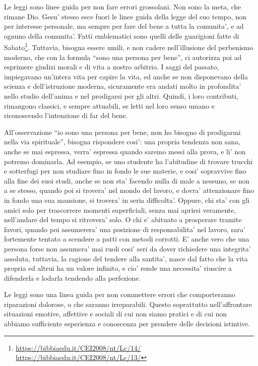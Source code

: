 Le leggi sono linee guida per non fare errori grossolani. Non sono la meta, che rimane Dio. Gesu' stesso esce fuori le linee guida della legge del suo tempo, non per interesse personale, ma sempre per fare del bene a tutta la comunita', e ad ognuno della comunita'. Fatti emblematici sono quelli delle guarigioni fatte di Sabato\footnote{\url{https://bibbiaedu.it/CEI2008/nt/Lc/14/} \url{https://bibbiaedu.it/CEI2008/nt/Lc/13/}}. Tuttavia, bisogna essere umili, e non cadere nell'illusione del perbenismo moderno, che con la formula ``sono una persona per bene'', ci autorizza poi ad esprimere giudizi morali e di vita a nostro arbitrio. I saggi del passato, impiegavano un'intera vita per capire la vita, ed anche se non disponevano della scienza e dell'istruzione moderna, sicuramente era andati molto in profondita' nello studio dell'anima e nel prodigarsi per gli altri. Quindi, i loro contributi, rimangono classici, e sempre attuabili, se letti nel loro senso umano e riconoscendo l'intenzione di far del bene.

All'osservazione ``io sono una persona per bene, non ho bisogno di prodigarmi nella via spirituale'', bisogna rispondere cosi': una propria tendenza non sana, anche se mai espressa, verra' espressa quando saremo messi alla prova, e li' non potremo dominarla. Ad esempio, se uno studente ha l'abitudine di trovare trucchi e sotterfugi per non studiare fino in fondo le sue materie, e cosi' sopravvive fino alla fine dei suoi studi, anche se non sta' facendo nulla di male a nessuno, se non a se stesso, quando poi si trovera' nel mondo del lavoro, e dovra' attenzionare fino in fondo una sua mansione, si trovera' in seria difficolta'. Oppure, chi sta' con gli amici solo per trascorrere momenti superficiali, senza mai aprirsi veramente, nell'andare del tempo si ritrovera' solo. O chi e' abituato a prosperare tramite favori, quando poi assumerera' una posizione di responsabilita' nel lavoro, sara' fortemente tentato a scendere a patti con metodi corrotti. E' anche vero che una persona forse non assumera' mai ruoli cosi' seri da dover richiedere una integrita' assoluta, tuttavia, la ragione del tendere alla santita', nasce dal fatto che la vita propria ed altrui ha un valore infinito, e cio' rende una necessita' riuscire a difenderla e lodarla tendendo alla perfezione.

Le leggi sono una linea guida per non commettere errori che comporteranno riparazioni dolorose, o che saranno irreparabili. Questo soprattutto nell'affrontare situazioni emotive, affettive e sociali di cui non siamo pratici e di cui non abbiamo sufficiente esperienza e conoscenza per prendere delle decisioni istintive.

